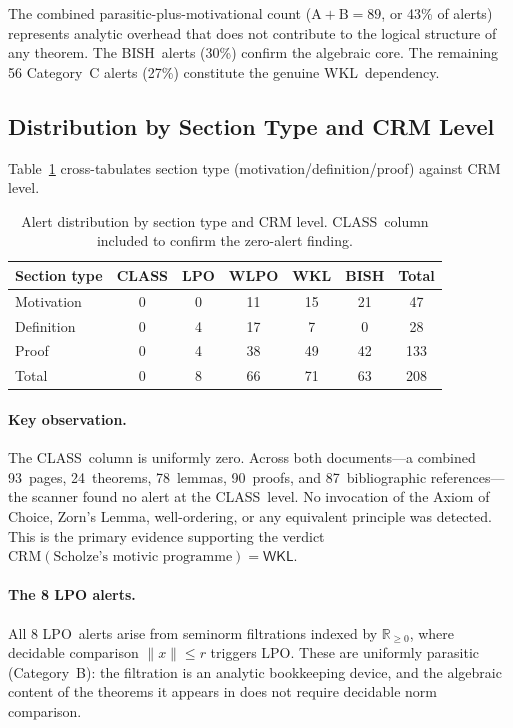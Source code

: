 \documentclass[11pt]{article}
\newcommand{\BISH}{\textsf{BISH}}
\newcommand{\WKL}{\textsf{WKL}}
\newcommand{\WLPO}{\textsf{WLPO}}
\newcommand{\LPO}{\textsf{LPO}}
\newcommand{\CLASS}{\textsf{CLASS}}
\begin{document}
The combined parasitic-plus-motivational count ($\text{A} + \text{B} = 89$,
or 43\% of alerts) represents analytic overhead that does not contribute
to the logical structure of any theorem.  The \BISH\ alerts (30\%) confirm
the algebraic core.  The remaining 56 Category~C alerts (27\%) constitute
the genuine \WKL\ dependency.

\subsection{Distribution by Section Type and CRM Level}

Table~\ref{tab:section-level} cross-tabulates section type
(motivation/definition/proof) against CRM level.

\begin{table}[ht]
\centering
\caption{Alert distribution by section type and CRM level.
  \CLASS\ column included to confirm the zero-alert finding.}
\label{tab:section-level}
\begin{tabular}{@{}lcccccc@{}}
\toprule
Section type & \CLASS & \LPO & \WLPO & \WKL & \BISH & Total \\
\midrule
Motivation  & 0 & 0  & 11 & 15 & 21 & 47  \\
Definition  & 0 & 4  & 17 &  7 &  0 & 28  \\
Proof       & 0 & 4  & 38 & 49 & 42 & 133 \\
\midrule
Total       & 0 & 8  & 66 & 71 & 63 & 208 \\
\bottomrule
\end{tabular}
\end{table}

\paragraph{Key observation.}
The \CLASS\ column is uniformly zero.  Across both documents---a combined
93~pages, 24~theorems, 78~lemmas, 90~proofs, and 87~bibliographic
references---the scanner found no alert at the \CLASS\ level.  No
invocation of the Axiom of Choice, Zorn's Lemma, well-ordering, or
any equivalent principle was detected.  This is the primary evidence
supporting the verdict $\mathrm{CRM}(\text{Scholze's motivic programme})
= \WKL$.

\paragraph{The 8 LPO alerts.}
All 8 \LPO\ alerts arise from seminorm filtrations indexed by
$\mathbb{R}_{\geq 0}$, where decidable comparison $\|x\| \leq r$
triggers \LPO.  These are uniformly parasitic (Category~B): the filtration
is an analytic bookkeeping device, and the algebraic content of the
theorems it appears in does not require decidable norm comparison.
\end{document}
